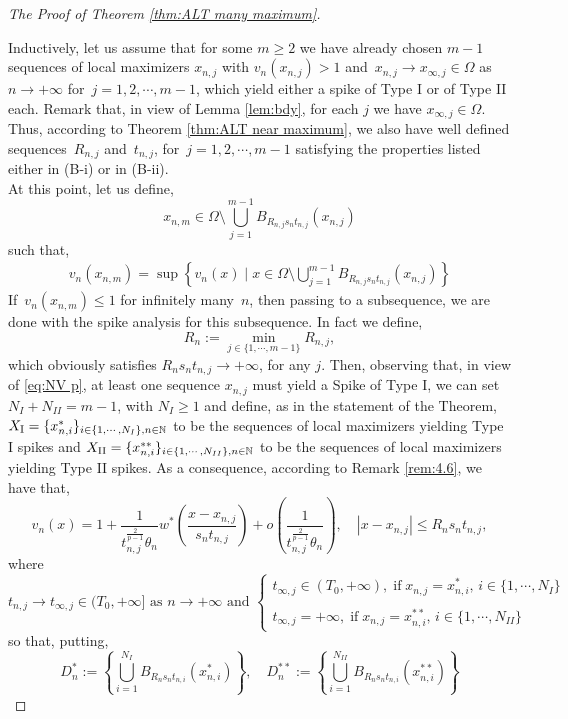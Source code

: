 \documentclass[10pt]{amsart}
\newcommand{\braces}[1]{\left\{#1\right\}} %
\def\N{\mathbb{N}}
\renewcommand{\to}{\rightarrow}
\newcommand{\ii}{\infty}
\newcommand{\om}{\Omega}
\newcommand{\graf}[1]{\left\{\begin{array}{ll}#1\end{array}\right.}
\begin{document}
\begin{proof}[The Proof of Theorem \ref{thm:ALT many maximum}]
\


    Inductively, let us assume that for some $m\geq 2$ we have already chosen $m-1$ sequences of local maximizers
    $x_{n,j}$ with $v_n(x_{n,j})>1$ and~$x_{n,j}\to x_{\infty,j}\in\om$ as~$n\to+\infty$ for~$j=1,2,\cdots,m-1$, which yield either
    a spike of Type I or of Type II each. Remark that, in view of Lemma \ref{lem:bdy}, for each $j$ we have $x_{\infty,j}\in\om$.
    Thus, according to Theorem \ref{thm:ALT near maximum}, we also have well defined
    sequences~$R_{n,j}$ and~$t_{n,j}$, for~$j=1,2,\cdots, m-1$ satisfying the properties listed either in (B-i) or in (B-ii).\\
    At this point, let us define,
    $$
    x_{n,m}\in\Omega\setminus \bigcup_{j=1}^{m-1} B_{R_{n,j}s_n t_{n,j}}(x_{n,j})
    $$
    such that,
    \begin{align*}
        v_n(x_{n,m})=\sup\braces{v_n(x)\mid x\in \Omega\setminus \bigcup_{j=1}^{m-1} B_{R_{n,j}s_n t_{n,j}}(x_{n,j})}
    \end{align*}
    If~$v_n(x_{n,m})\leq 1$ for infinitely many~$n$, then passing to a subsequence, we are done with the spike analysis for this subsequence.
    In fact we define,
    $$
    R_{n}:=\min\limits_{j\in \{1,\cdots,m-1\}}R_{n,j},
    $$
    which obviously satisfies $R_n s_nt_{n,j}\to +\ii$, for any $j$.
    Then, observing that, in view of \eqref{eq:NV p}, at least one sequence $x_{n,j}$ must yield a Spike of Type I, we can set $N_I+N_{II}=m-1$, with
    $N_{I}\geq 1$ and define, as in the statement of the Theorem, $X_{\rm I}=\{x^*_{n,i}\}_{i\in\{1,\cdots,N_I\}, n\in\N}$
    to be the sequences of local maximizers yielding Type I spikes and $X_{\rm II}=\{x^{**}_{n,i}\}_{i\in\{1,\cdots,N_{II}\},n\in\N}$
    to be the sequences of local maximizers yielding Type II spikes.
    As a consequence, according to Remark \ref{rem:4.6}, we have that,
     $$
     v_n(x)= 1+\frac{1}{t_{n,j}^{\frac{2}{p-1}}\theta_n} w^*(\frac{x-x_{n,j}}{s_n t_{n,j}})+ o(\frac{1}{t_{n,j}^{\frac{2}{p-1}}\theta_n }),
     \quad |x-x_{n,j}|\leq R_{n}s_nt_{n,j},
     $$
     where
     $$
     t_{n,j}\to t_{\ii,j}\in (T_0,+\ii] \mbox{ as }n\to+\infty \mbox{ and }
     \graf{t_{\ii,j}\in (T_0,+\ii), \;\mbox{if}\; x_{n,j}=x^*_{n,i},\,i\in \{1,\cdots,N_{I}\}\\\,\\
     t_{\ii,j}=+\ii, \;\mbox{if}\; x_{n,j}=x^{**}_{n,i},\,i\in \{1,\cdots,N_{II}\}}
     $$
     so that, putting,
     $$
     D^*_n:=\left\{\bigcup_{i=1}^{N_I} B_{R_{n}s_n t_{n,i}}(x^*_{n,i})\right\},\quad
     D^{**}_n:=\left\{\bigcup_{i=1}^{N_{II}} B_{R_{n}s_n t_{n,i}}(x^{**}_{n,i})\right\}
     $$


\end{proof}
\end{document}
